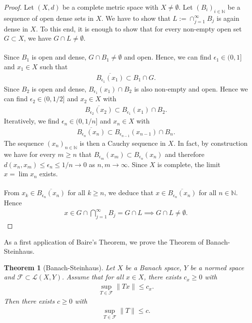 \documentclass[11pt,a4paper]{article}
\newtheorem{thm}{Theorem}[section]
\theoremstyle{definition}
\begin{document}
\begin{proof}
Let $(X,d)$ be a complete metric space with $X \neq \emptyset$. Let $(B_i)_{i \in \mathbb{N}}$ be a sequence of open dense sets in $X$. We have to show that $L:= \cap_{j=1}^\infty B_j$ is again dense in $X$. To this end, it is enough to show that for every non-empty open set $G \subset X$, we have $G \cap L \neq \emptyset$. 
\\\\
Since $B_1$ is open and dense, $G \cap B_1 \neq \emptyset$ and open. Hence, we can find $\epsilon_1 \in (0, 1 ]$ and $x_1 \in X$ such that 
\begin{align*}
\overline{B_{\epsilon_1}(x_1)} \subset B_1 \cap G.
\end{align*}
Since $B_2$ is open and dense, $B_{ \epsilon_1}(x_1) \cap B_2$ is also non-empty and open. Hence we can find $\epsilon_2 \in (0, 1/2]$ and $x_2 \in X$ with 
\begin{align*}
\overline{B_{\epsilon_2}(x_2)} \subset B_{ \epsilon_1} (x_1) \cap B_2.
\end{align*}
Iteratively, we find $\epsilon_n \in (0, 1/n]$ and $x_n \in X$ with 
\begin{align*}
\overline{B_{ \epsilon_n}(x_n)} \subset B_{ \epsilon_{n-1}}(x_{n-1}) \cap B_n.
\end{align*}
The sequence $(x_n)_{n \in \mathbb{N}}$ is then a Cauchy sequence in $X$. In fact, by construction we have for every $m \geq n$ that $B_{ \epsilon_m}(x_m) \subset B_{ \epsilon_n}(x_n)$ and therefore $d(x_n,x_m) \leq \epsilon_n \leq 1/n \to 0$ as $n,m \to \infty$. Since $X$ is complete, the limit $x= \lim x_n$ exists. 
\\\\
From $x_k \in \overline{B_{ \epsilon_n}(x_n)}$ for all $k \geq n$, we deduce that $x \in \overline{B_{ \epsilon_n}(x_n)}$ for all $n \in \mathbb{N}$. Hence 
\begin{align*}
x \in G \cap \bigcap_{j=1}^\infty B_j = G \cap L \implies G \cap L \neq \emptyset. 
\end{align*}
\end{proof}
\noindent As a first application of Baire's Theorem, we prove the Theorem of Banach-Steinhaus. 
\begin{thm}[Banach-Steinhaus] Let $X$ be a Banach space, $Y$ be a normed space and $\mathcal{F} \subset \mathcal{L}(X,Y)$. Assume that for all $x \in X$, there exists $c_x \geq 0$ with 
\begin{align*}
\sup_{T \in \mathcal{F}} \| Tx\| \leq c_x.
\end{align*}
Then there exists $c \geq 0$ with 
\begin{align*}
\sup_{T \in \mathcal{F}} \| T \|  \leq c. 
\end{align*}
\end{thm}
\end{document}
